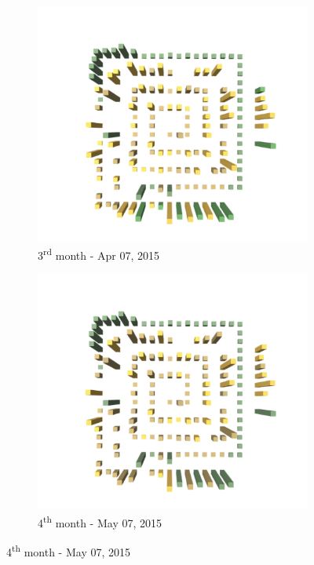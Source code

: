 \begin{figure}[ht]
    \medskip
    \begin{subfigure}{0.48\textwidth}
        \includegraphics[width=\linewidth]{JetUML_V1S3.png}
        \caption{3\textsuperscript{rd} month - Apr 07, 2015} \label{fig:JetUML_V1S3}
    \end{subfigure}\hspace*{\fill}
    \begin{subfigure}{0.48\textwidth}
    \includegraphics[width=\linewidth]{JetUML_V1S4.png}
    \caption{4\textsuperscript{th} month - May 07, 2015} \label{fig:JetUML_V1S4}
    \end{subfigure}
    

\end{figure}
